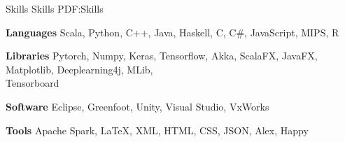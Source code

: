 \Section
{Skills}
{Skills}
{PDF:Skills}

\Entry
\textbf{Languages}
\SubEntry
\Gap
Scala, Python, C++, Java, Haskell, C, C\#, JavaScript, MIPS, R

\BigGap
\Entry
\textbf{Libraries}
\SubEntry
\Gap
Pytorch, Numpy, Keras, Tensorflow, Akka, ScalaFX, JavaFX, Matplotlib, Deeplearning4j, MLib, \\Tensorboard

\BigGap
\Entry
\textbf{Software}
\SubEntry
\Gap
Eclipse, Greenfoot, Unity, Visual Studio, VxWorks

\BigGap
\Entry
\textbf{Tools}
\SubEntry
\Gap
Apache Spark, LaTeX, XML, HTML, CSS, JSON, Alex, Happy
